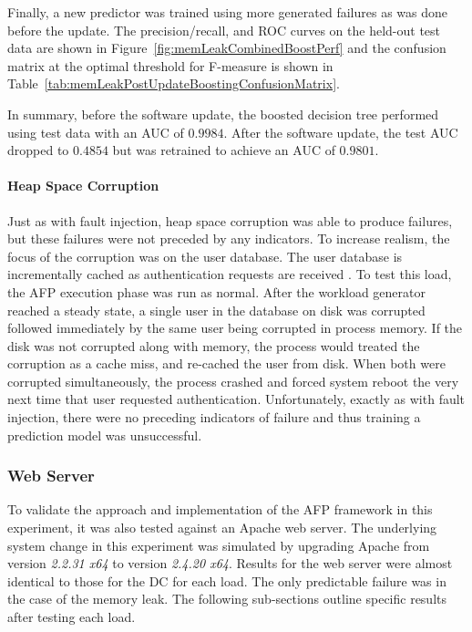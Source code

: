 Finally, a new predictor was trained using more generated failures as was done
before the update.  The precision/recall, and \ac{ROC} curves on the held-out
test data are shown in Figure~\ref{fig:memLeakCombinedBoostPerf} and the
confusion matrix at the optimal threshold for F-measure is shown in
Table~\ref{tab:memLeakPostUpdateBoostingConfusionMatrix}.

\tabMemLeakPostUpdateBoostingConfusionMatrix

In summary, before the software update, the boosted decision tree performed
using test data with an \ac{AUC} of $0.9984$.  After the software update, the
test \ac{AUC} dropped to $0.4854$ but was retrained to achieve an \ac{AUC} of
$0.9801$.

\paragraph{Heap Space Corruption}
Just as with fault injection, heap space corruption was able to produce
failures, but these failures were not preceded by any indicators.  To increase
realism, the focus of the corruption was on the user database.  The user
database is incrementally cached as authentication requests are received
\citep{russinovich2009}.  To test this load, the \ac{AFP} execution phase was
run as normal.  After the workload generator reached a steady state, a single
user in the database on disk was corrupted followed immediately by the same
user being corrupted in process memory.  If the disk was not corrupted along
with memory, the process would treated the corruption as a cache miss, and
re-cached the user from disk.  When both were corrupted simultaneously, the
process crashed and forced system reboot the very next time that user requested
authentication.  Unfortunately, exactly as with fault injection, there were no
preceding indicators of failure and thus training a prediction model was
unsuccessful.

\subsubsection{Web Server}
To validate the approach and implementation of the \ac{AFP} framework in this
experiment, it was also tested against an Apache web server.  The underlying
system change in this experiment was simulated by upgrading Apache from version
\emph{2.2.31 x64} to version \emph{2.4.20 x64}.  Results for the web server
were almost identical to those for the \ac{DC} for each load.  The only
predictable failure was in the case of the memory leak.  The following
sub-sections outline specific results after testing each load.

